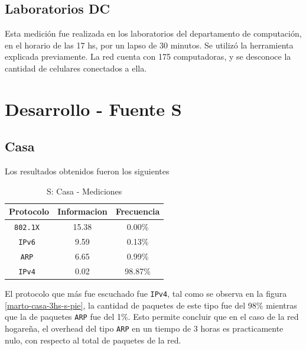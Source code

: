 \documentclass[final,inline,a4paper,narroweqnarray]{ieee}
\begin{document}
\subsection{Laboratorios DC}

  Esta medición fue realizada en los laboratorios del departamento de
  computación, en el horario de las 17 hs, por un lapso de 30 minutos.
  Se utilizó la herramienta explicada previamente. La red cuenta con
  175 computadoras, y se desconoce la cantidad de celulares conectados
  a ella.

\section{Desarrollo - Fuente S}
  \subsection{Casa}

   Los resultados obtenidos fueron los siguientes

\begin{table}[h]\begin{center}
    \begin{tabular}{|c|c|c|}
    \hline
    \textbf{Protocolo} & \textbf{Informacion} & \textbf{Frecuencia} \\ \hline
    \texttt{802.1X    }& 15.38       & 0.00\%     \\ \hline
    \texttt{IPv6      }& 9.59        & 0.13\%     \\ \hline
    \texttt{ARP       }& 6.65        & 0.99\%     \\ \hline
    \texttt{IPv4      }& 0.02        & 98.87\%    \\ \hline
    \end{tabular}
    \caption{S: Casa - Mediciones}
    \label{casa-s-table}
\end{center}\end{table}

    El protocolo que más fue escuchado fue \texttt{IPv4}, tal como se
    observa en la figura \ref{marto-casa-3hs-s-pie}, la cantidad de
    paquetes  de este tipo fue del 98\% mientras que la de paquetes
    \texttt{ARP} fue del 1\%. Esto permite concluir que en el caso de
    la red hogareña, el overhead del tipo \texttt{ARP} en un tiempo de
    3 horas es practicamente nulo, con respecto al total de paquetes
    de la red.
\end{document}
